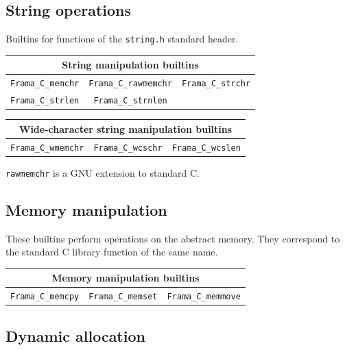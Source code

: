\documentclass{frama-c-book}
\begin{document}
\subsection{String operations}

Builtins for functions of the \lstinline|string.h| standard header.

\begin{table}[!ht]
  \centering
  \begin{tabular}{ccc}
    \multicolumn{3}{c}{String manipulation builtins} \\
    \hline
    \lstinline|Frama_C_memchr| &
    \lstinline|Frama_C_rawmemchr| &
    \lstinline|Frama_C_strchr| \\
    \lstinline|Frama_C_strlen| &
    \lstinline|Frama_C_strnlen|
  \end{tabular}
\end{table}

\begin{table}[!ht]
  \centering
  \begin{tabular}{ccc}
    \multicolumn{3}{c}{Wide-character string manipulation builtins} \\
    \hline
    \lstinline|Frama_C_wmemchr| &
    \lstinline|Frama_C_wcschr| &
    \lstinline|Frama_C_wcslen|
  \end{tabular}
\end{table}

\begin{important}
  \lstinline|rawmemchr| is a GNU extension to standard C.
\end{important}

\subsection{Memory manipulation}
These builtins perform operations on the abstract memory.
They correspond to the standard C library function of the same name.

\begin{table}[!ht]
  \centering
  \begin{tabular}{ccc}
    \multicolumn{3}{c}{Memory manipulation builtins} \\
    \hline
    \lstinline|Frama_C_memcpy| &
    \lstinline|Frama_C_memset| &
    \lstinline|Frama_C_memmove|
  \end{tabular}
\end{table}

\subsection{Dynamic allocation}
\end{document}
